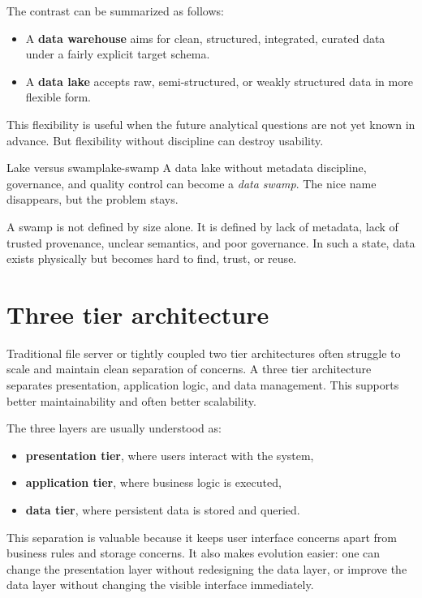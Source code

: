 \documentclass[11pt,a4paper,openany]{book}
\begin{document}
The contrast can be summarized as follows:
\begin{itemize}
\item A \textbf{data warehouse} aims for clean, structured, integrated, curated data under a fairly explicit target schema.
\item A \textbf{data lake} accepts raw, semi-structured, or weakly structured data in more flexible form.
\end{itemize}

This flexibility is useful when the future analytical questions are not yet known in advance. But flexibility without discipline can destroy usability.

\begin{remark}{Lake versus swamp}{lake-swamp}
A data lake without metadata discipline, governance, and quality control can become a \emph{data swamp}. The nice name disappears, but the problem stays.
\end{remark}

A swamp is not defined by size alone. It is defined by lack of metadata, lack of trusted provenance, unclear semantics, and poor governance. In such a state, data exists physically but becomes hard to find, trust, or reuse.

\section{Three tier architecture}
Traditional file server or tightly coupled two tier architectures often struggle to scale and maintain clean separation of concerns. A three tier architecture separates presentation, application logic, and data management. This supports better maintainability and often better scalability.

The three layers are usually understood as:
\begin{itemize}
\item \textbf{presentation tier}, where users interact with the system,
\item \textbf{application tier}, where business logic is executed,
\item \textbf{data tier}, where persistent data is stored and queried.
\end{itemize}

This separation is valuable because it keeps user interface concerns apart from business rules and storage concerns. It also makes evolution easier: one can change the presentation layer without redesigning the data layer, or improve the data layer without changing the visible interface immediately.
\end{document}
